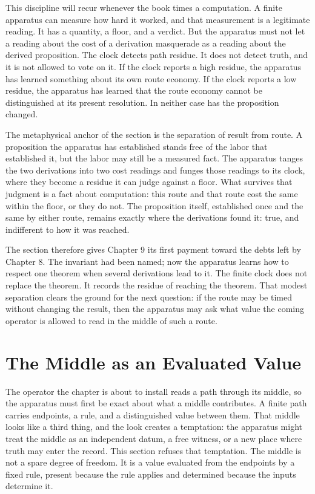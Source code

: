 This discipline will recur whenever the book times a computation. A finite
apparatus can measure how hard it worked, and that measurement is a legitimate
reading. It has a quantity, a floor, and a verdict. But the apparatus must not
let a reading about the cost of a derivation masquerade as a reading about the
derived proposition. The clock detects path residue. It does not detect truth,
and it is not allowed to vote on it. If the clock reports a high residue, the
apparatus has learned something about its own route economy. If the clock
reports a low residue, the apparatus has learned that the route economy cannot
be distinguished at its present resolution. In neither case has the proposition
changed.

The metaphysical anchor of the section is the separation of result from route.
A proposition the apparatus has established stands free of the labor that
established it, but the labor may still be a measured fact. The apparatus
tanges the two derivations into two cost readings and funges those readings to
its clock, where they become a residue it can judge against a floor. What
survives that judgment is a fact about computation: this route and that route
cost the same within the floor, or they do not. The proposition itself,
established once and the same by either route, remains exactly where the
derivations found it: true, and indifferent to how it was reached.

The section therefore gives Chapter 9 its first payment toward the debts left by
Chapter 8. The invariant had been named; now the apparatus learns how to respect
one theorem when several derivations lead to it. The finite clock does not
replace the theorem. It records the residue of reaching the theorem. That modest
separation clears the ground for the next question: if the route may be timed
without changing the result, then the apparatus may ask what value the coming
operator is allowed to read in the middle of such a route.

\section{The Middle as an Evaluated Value}

The operator the chapter is about to install reads a path through its middle, so
the apparatus must first be exact about what a middle contributes. A finite path
carries endpoints, a rule, and a distinguished value between them. That middle
looks like a third thing, and the look creates a temptation: the apparatus might
treat the middle as an independent datum, a free witness, or a new place where
truth may enter the record. This section refuses that temptation. The middle is
not a spare degree of freedom. It is a value evaluated from the endpoints by a
fixed rule, present because the rule applies and determined because the inputs
determine it.

